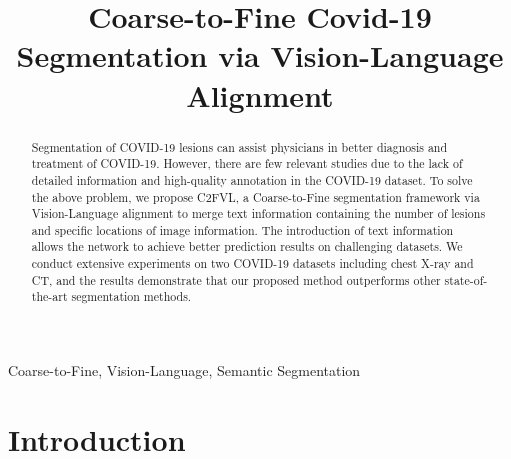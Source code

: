 \documentclass{article}
\title{Coarse-to-Fine Covid-19 Segmentation via Vision-Language Alignment}
\begin{document}
\topmargin=0mm
%
\maketitle
%
\begin{abstract}
Segmentation of COVID-19 lesions can assist physicians in better diagnosis and treatment of COVID-19. However, there are few relevant studies due to the lack of detailed information and high-quality annotation in the COVID-19 dataset. To solve the above problem, we propose C2FVL, a Coarse-to-Fine segmentation framework via Vision-Language alignment to merge text information containing the number of lesions and specific locations of image information. The introduction of text information allows the network to achieve better prediction results on challenging datasets. We conduct extensive experiments on two COVID-19 datasets including chest X-ray and CT, and the results demonstrate that our proposed method outperforms other state-of-the-art segmentation methods.
\end{abstract}
%
\begin{keywords}
Coarse-to-Fine, Vision-Language, Semantic Segmentation
\end{keywords}
%
\section{Introduction}
\label{sec:intro}
\end{document}
